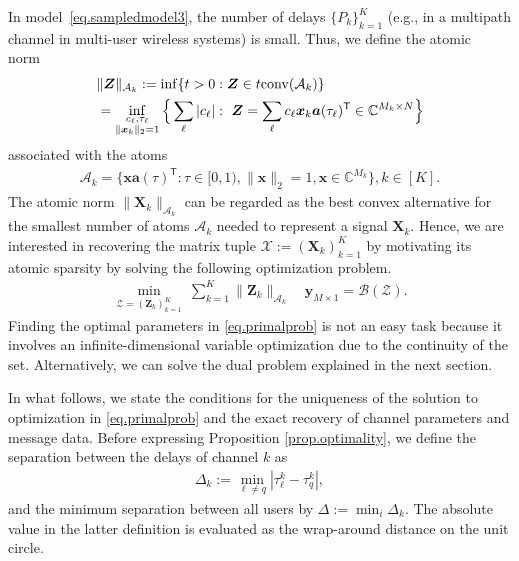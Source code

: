 \documentclass[conference,10pt]{IEEEtran}
\theoremstyle{remark}
\theoremstyle{plain}
\theoremstyle{definition}
\theoremstyle{remark}
\begin{document}
 In model~\eqref{eq.sampledmodel3}, the number of delays $\{P_k\}_{k=1}^K$ (e.g., in a multipath channel in multi-user wireless systems) is small. 
 Thus, we define the atomic norm~\cite{chandrasekaran2012convex}
 \begin{align}\label{eq.atomic_def}
 &\|\bm{Z}\|_{\mathcal{A}_k}:=\inf\{t>0: \bm{Z}\in t{\rm conv}(\mathcal{A}_k)\}\nonumber\\
 &=\inf_{\substack{c_{\ell}, \tau_{\ell}\\\|{\bm{x}_k}\|_2=1}}\Big\{\sum_{\ell}|c_{\ell}|:~\bm{Z}=\sum_{\ell}c_{\ell} \bm{x}_k\bm{a}(\tau_{\ell})^{\mathsf{T}}  \in\mathbb{C}^{M_k\times N} \Big\}
 \end{align}
 associated with the atoms
 \begin{align*}
 \mathcal{A}_k=\big\{\bm{x}\bm{a}(\tau)^{\mathsf{T}}: \tau\in[0,1), \|\bm{x}\|_2=1, \bm{x}\in\mathbb{C}^{M_k} \big\}, k\in [K].
 \end{align*}
  The atomic norm $\|\bm{X}_k\|_{\mathcal{A}_k}$ can be regarded as the best convex alternative for the smallest number of atoms $\mathcal{A}_k$ needed to represent a signal $\bm{X}_k$. Hence, we are interested in recovering the matrix tuple $\bm{\mathcal{X}}:=(\bm{X}_k)_{k=1}^K$ by motivating its atomic sparsity by solving the following optimization problem. 
 \begin{align}\label{eq.primalprob}
 \min_{\bm{\mathcal{Z}}=(\bm{Z}_k)_{k=1}^K} ~\sum_{k=1}^{K}\|\bm{Z}_k\|_{\mathcal{A}_k}\quad 
 \bm{y}_{M\times 1}=\mathcal{B}(\bm{\mathcal{Z}}).	
 \end{align} 
Finding the optimal parameters in \eqref{eq.primalprob} is not an easy task because it involves an infinite-dimensional variable optimization due to the continuity of the set. Alternatively, we can solve the dual problem explained in the next section. 

In what follows, we state the conditions for the uniqueness of the solution to optimization in \eqref{eq.primalprob} and the exact recovery of channel parameters and message data. Before expressing Proposition \ref{prop.optimality}, we define the separation between the delays of channel $k$ as
 \begin{align}
 \Delta_k:=\min_{\ell \neq q}|\tau^k_{\ell}-\tau^k_q|,
 \end{align} 
and the minimum separation between all users by $\Delta:=\min_{i} \Delta_k$. The absolute value in the latter definition is evaluated as the wrap-around distance on the unit circle.
\end{document}
